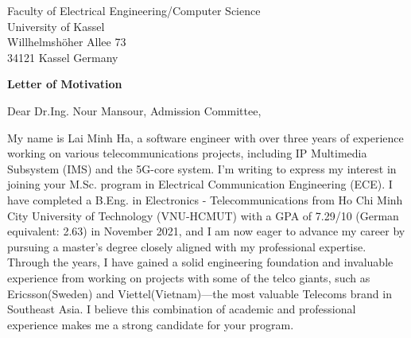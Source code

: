 \documentclass[a4paper,12pt]{letter}
\date{}
\begin{document}
\begin{letter}{
    Faculty of Electrical Engineering/Computer Science
    \\ University of Kassel
    \\ Willhelmshöher Allee 73
    \\ 34121 Kassel Germany
}

\vspace*{-1.5cm}
\begin{center}
    \LARGE \textbf{Letter of Motivation}
\end{center}

\vspace{0.2cm} %

\opening{Dear Dr.Ing. Nour Mansour, Admission Committee,}

My name is Lai Minh Ha, a software engineer with over three years of experience working on various telecommunications projects, including IP Multimedia Subsystem (IMS) and the 5G-core system. I'm writing to express my interest in joining your M.Sc. program in Electrical Communication Engineering (ECE). I have completed a B.Eng. in Electronics - Telecommunications from Ho Chi Minh City University of Technology (VNU-HCMUT) with a GPA of 7.29/10 (German equivalent: 2.63) in November 2021, and I am now eager to advance my career by pursuing a master's degree closely aligned with my professional expertise. 
Through the years, I have gained a solid engineering foundation and invaluable experience from working on projects with some of the telco giants, such as Ericsson(Sweden) and Viettel(Vietnam)—the most valuable Telecoms brand in Southeast Asia. I believe this combination of academic and professional experience makes me a strong candidate for your program.

% 


\end{letter}
\end{document}
